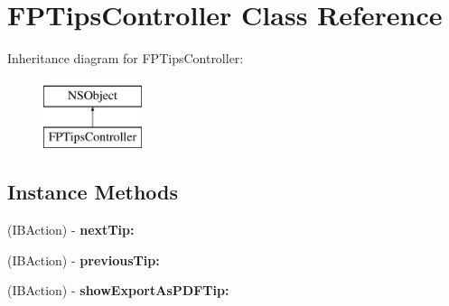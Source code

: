 \hypertarget{interface_f_p_tips_controller}{}\section{F\+P\+Tips\+Controller Class Reference}
\label{interface_f_p_tips_controller}
Inheritance diagram for F\+P\+Tips\+Controller\+:\begin{figure}[H]
\begin{center}
\leavevmode
\includegraphics[height=2.000000cm]{interface_f_p_tips_controller}
\end{center}
\end{figure}
\subsection*{Instance Methods}
\begin{DoxyCompactItemize}
\item 
\mbox{\label{interface_f_p_tips_controller_a095c0ec962fac7ab1795742195cb4000}} 
(I\+B\+Action) -\/ {\bfseries next\+Tip\+:}
\item 
\mbox{\label{interface_f_p_tips_controller_a3fd1efe18c4fecd44b4d1aa522622ef9}} 
(I\+B\+Action) -\/ {\bfseries previous\+Tip\+:}
\item 
\mbox{\label{interface_f_p_tips_controller_a61182c7c1d4bf4284c0f8c8f6dd73ccc}} 
(I\+B\+Action) -\/ {\bfseries show\+Export\+As\+P\+D\+F\+Tip\+:}
\end{DoxyCompactItemize}
